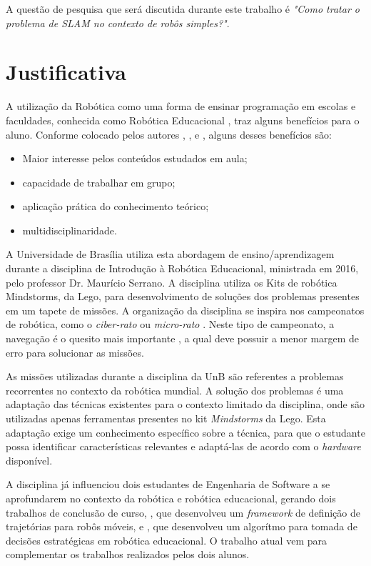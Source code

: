 	A questão de pesquisa que será discutida durante este trabalho é \textit{"Como tratar o problema de SLAM no contexto de robôs simples?"}.

\section{Justificativa}

	A utilização da Robótica como uma forma de ensinar programação em escolas e faculdades, conhecida como Robótica Educacional \cite{roboticaEducacionalAulasMatematica}, traz alguns benefícios para o aluno. Conforme colocado pelos autores \cite{teachingWithRoboticKit}, \cite{roboticEducationBasedLego}, \cite{roboticaEducacionalAulasMatematica} e \cite{evaluationRoboticEducationScale}, alguns desses benefícios são: 
	\begin{itemize}
		\item Maior interesse pelos conteúdos estudados em aula;
		\item capacidade de trabalhar em grupo;
		\item aplicação prática do conhecimento teórico;
		\item multidisciplinaridade.
	\end{itemize}
	 
	 A Universidade de Brasília utiliza esta abordagem de ensino/aprendizagem durante a disciplina de Introdução à Robótica Educacional, ministrada em 2016, pelo professor Dr. Maurício Serrano. A disciplina utiliza os Kits de robótica Mindstorms, da Lego, para desenvolvimento de soluções dos problemas presentes em um tapete de missões. A organização da disciplina se inspira nos campeonatos de robótica, como o \textit{ciber-rato} \cite{ciber-rato} ou \textit{micro-rato} \cite{roboBulldozerIV}. Neste tipo de campeonato, a navegação é o quesito mais importante \cite{ciber-rato}, a qual deve possuir a menor margem de erro para solucionar as missões.

	As missões utilizadas durante a disciplina da UnB são referentes a problemas recorrentes no contexto da robótica mundial. A solução dos problemas é uma adaptação das técnicas existentes para o contexto limitado da disciplina, onde são utilizadas apenas ferramentas presentes no kit \textit{Mindstorms} da Lego. Esta adaptação exige um conhecimento específico sobre a técnica, para que o estudante possa identificar características relevantes e adaptá-las de acordo com o \textit{hardware} disponível.

	A disciplina já influenciou dois estudantes de Engenharia de Software a se aprofundarem no contexto da robótica e robótica educacional, gerando dois trabalhos de conclusão de curso, \cite{tccRodrigo}, que desenvolveu um \textit{framework} de definição de trajetórias para robôs móveis, e \cite{tccCarol}, que desenvolveu um algorítmo para tomada de decisões estratégicas em robótica educacional. O trabalho atual vem para complementar os trabalhos realizados pelos dois alunos.


